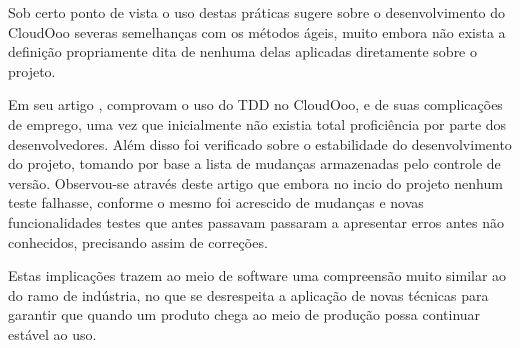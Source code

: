Sob certo ponto de vista o uso destas práticas sugere sobre o desenvolvimento do CloudOoo severas semelhanças com os métodos ágeis, muito embora não exista a definição propriamente dita de nenhuma delas aplicadas diretamente sobre o projeto.

Em seu artigo \cite{SILVA-MONNERAT-CARVALHO}, comprovam o uso do TDD no CloudOoo, e de suas complicações de emprego, uma vez que inicialmente não existia total proficiência por parte dos desenvolvedores. Além disso foi verificado sobre o estabilidade do desenvolvimento do projeto, tomando por base a lista de mudanças armazenadas pelo controle de versão. Observou-se através deste artigo que embora no incio do projeto nenhum teste falhasse, conforme o mesmo foi acrescido de mudanças e novas funcionalidades testes que antes passavam passaram a apresentar erros antes não conhecidos, precisando assim de correções.

Estas implicações trazem ao meio de software uma compreensão muito similar ao do ramo de indústria, no que se desrespeita a aplicação de novas técnicas para garantir que quando um produto chega ao meio de produção possa continuar estável ao uso.
